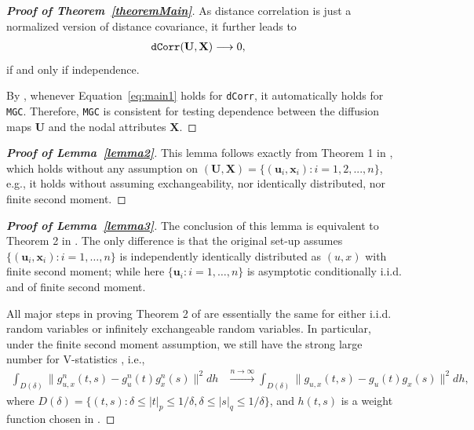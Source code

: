 \documentclass[11pt]{article}
\theoremstyle{definition}
\begin{document}
\begin{proof}[\textbf{Proof of Theorem~\ref{theoremMain}}]
As distance correlation is just a normalized version of distance covariance, it further leads to
\begin{eqnarray}
\mbox{\texttt{dCorr}}(\mathbf{U},\mathbf{X}) &\longrightarrow 0,
\label{eq:main1}
\end{eqnarray}
if and only if independence.

By \cite{shen2016discovering}, whenever Equation~\ref{eq:main1} holds for \texttt{dCorr}, it automatically holds for \texttt{MGC}. Therefore, \texttt{MGC} is consistent for testing dependence between the diffusion maps $\mathbf{U}$ and the nodal attributes $\mathbf{X}$.
\end{proof}

\begin{proof}[\textbf{Proof of Lemma~\ref{lemma2}}] 
This lemma follows exactly from Theorem 1 in \cite{szekely2007measuring}, which holds without any assumption on $(\mathbf{U}, \mathbf{X} ) =  \{(\mathbf{u}_{i},\mathbf{x}_{i}) :  i=1,2,...,n\}$, e.g., it holds without assuming exchangeability, nor identically distributed, nor finite second moment.
\end{proof}

\begin{proof}[\textbf{Proof of Lemma~\ref{lemma3}}] 
The conclusion of this lemma is equivalent to Theorem 2 in \cite{szekely2007measuring}. The only difference is that the original set-up assumes $\{(\mathbf{u}_{i},\mathbf{x}_{i}) : i = 1, \ldots , n \}$ is independently identically distributed as $(u,x)$ with finite second moment; while here $\{  \mathbf{u}_{i} : i = 1, \ldots, n  \}$ is asymptotic conditionally i.i.d. and of finite second moment.

All major steps in proving Theorem 2 of \cite{szekely2007measuring} are essentially the same for either i.i.d. random variables or infinitely exchangeable random variables. In particular, under the finite second moment assumption, we still have the strong large number for V-statistics \cite{KoroljukBook}, i.e., 
	\begin{eqnarray}
	\displaystyle\int_{D(\delta)}{\|g_{u,x}^{n}(t,s)-g_{u}^{n}(t)g_{x}^{n}(s)\|^{2}}dh &\stackrel{n \rightarrow \infty}{\longrightarrow} 
	\displaystyle\int_{D(\delta)}{\|g_{u,x}(t,s)-g_{u}(t)g_{x}(s)\|^{2}}dh,
	\label{eq:SLLN}
	\end{eqnarray}
	where $D(\delta)=\{(t,s):\delta \leq |t|_{p} \leq 1/\delta,\delta \leq |s|_{q} \leq 1/\delta\}$, and $h(t,s)$ is a weight function chosen in \cite{szekely2007measuring}. 
\end{proof}
\end{document}

